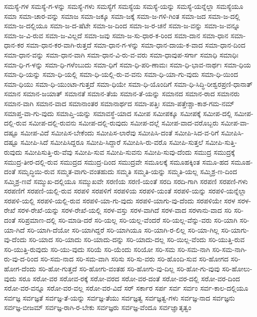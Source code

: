 {ಸಮಸ್ಯೆ-ಗಳ
ಸಮಸ್ಯೆ-ಗ-ಳನ್ನು
ಸಮಸ್ಯೆ-ಗಳು
ಸಮಸ್ಯೆಗೆ
ಸಮಸ್ಯೆಯ
ಸಮಸ್ಯೆ-ಯನ್ನು
ಸಮಸ್ಯೆ-ಯನ್ನೆಲ್ಲಾ
ಸಮಸ್ಯೆಯೂ
ಸಮಾ
ಸಮಾ-ಚಾರ-ವನ್ನು
ಸಮಾಜ
ಸಮಾ-ಜಕ್ಕೂ
ಸಮಾ-ಜಕ್ಕೆ
ಸಮಾ-ಜ-ಗಳಿ-ಗಿಂತ
ಸಮಾ-ಜದ
ಸಮಾ-ಜ-ದಲ್ಲಿ
ಸಮಾ-ಜ-ದಲ್ಲಿಯೂ
ಸಮಾ-ಜ-ದ-ಷೆಟೇ
ಸಮಾ-ಜ-ದಿಂದ
ಸಮಾ-ಜ-ರ-ಚನೆ
ಸಮಾ-ಜ-ವನ್ನು
ಸಮಾ-ಜ-ವನ್ನೂ
ಸಮಾ-ಜ-ವಿ-ರುವ
ಸಮಾ-ಜ-ವಿಲ್ಲದೆ
ಸಮಾ-ಜವು
ಸಮಾ-ಜ-ಸು-ಧಾರ-ಕ-ರಿಂದ
ಸಮಾ-ದಾನ
ಸಮಾ-ಧಾನ
ಸಮಾ-ಧಾನ-ಕರ
ಸಮಾ-ಧಾನ-ಕರ-ವಾಗಿ-ರುತ್ತದೆ
ಸಮಾ-ಧಾನ-ಗ-ಳನ್ನು
ಸಮಾ-ಧಾನ-ದಾಯ-ಕ-ವಾದ
ಸಮಾ-ಧಾನ-ದಿಂದ
ಸಮಾ-ಧಾನ-ವನ್ನು
ಸಮಾ-ಧಾನ-ವಾಗಿ
ಸಮಾ-ಧಾನ-ವಿ-ರು-ವ-ವರು
ಸಮಾ-ಧಾವುಪ-ಸರ್ಗಾ
ಸಮಾಧಿ
ಸಮಾಧಿಃ
ಸಮಾ-ಧಿ-ಗ-ಳನ್ನು
ಸಮಾ-ಧಿ-ಗಳೆಂಬುದು
ಸಮಾ-ಧಿಗೆ
ಸಮಾ-ಧಿ-ಪರಿ-ಣಾಮಃ
ಸಮಾ-ಧಿ-ಭಾವ-ನಾರ್ಥಃ
ಸಮಾ-ಧಿಯ
ಸಮಾ-ಧಿ-ಯನ್ನು
ಸಮಾ-ಧಿ-ಯಲ್ಲಿ
ಸಮಾ-ಧಿ-ಯಲ್ಲಿ-ರು-ವ-ವನು
ಸಮಾ-ಧಿ-ಯಾ-ಗು-ವುದು
ಸಮಾ-ಧಿ-ಯಿಂದ
ಸಮಾ-ಧಿಯು
ಸಮಾ-ಧಿ-ಯುಂಟಾ-ಗುತ್ತದೆ
ಸಮಾ-ಧಿಯೇ
ಸಮಾ-ಧಿ-ಯೊಂದಿಗೆ
ಸಮಾ-ಧಿ-ಸಿದ್ಧಿ-ರೀಶ್ವರಪ್ರಣಿ-ಧಾನಾತ್
ಸಮಾನ
ಸಮಾನ-ಜಯಾತ್
ಸಮಾನತೆ
ಸಮಾನ-ತೆಯ
ಸಮಾನ-ತೆ-ಯನ್ನು
ಸಮಾನದ
ಸಮಾನ-ರಾದ
ಸಮಾನರು
ಸಮಾನ-ವಾಗಿ
ಸಮಾನ-ವಾದ
ಸಮಾನಾಂತರ
ಸಮಾನಾರ್ಥದ
ಸಮಾ-ಪತ್ತಿಃ
ಸಮಾ-ಪತ್ತೇಶ್ಚಾ-ಕಾಶ-ಗಮ-ನಮ್
ಸಮಾಪ್ತ-ವಾ-ಗು-ವುದು
ಸಮಾಪ್ತಿ-ಯನ್ನು
ಸಮಾವಸ್ಥೆ-ಯಾದ
ಸಮೀಪ
ಸಮೀಪಕ್ಕೂ
ಸಮೀಪಕ್ಕೆ
ಸಮೀಪ-ದಲ್ಲಿ
ಸಮೀಪ-ದಲ್ಲಿ-ರುವ
ಸಮೀಪ-ದಲ್ಲಿ-ರುವನು
ಸಮೀಪ-ದಲ್ಲಿ-ರುವುದು
ಸಮೀಪ-ದಲ್ಲೆ
ಸಮೀಪ-ವಾದ-ವರೊಬ್ಬರು
ಸಮೀಪ-ವಾ-ದಷ್ಟೂ
ಸಮೀಪ-ವಿದೆ
ಸಮೀಪಿಸ-ಬೇಕೆಂದು
ಸಮೀಪಿಸ-ಲಾರೆವು
ಸಮೀಪಿಸಿ-ದಂತೆ
ಸಮೀಪಿ-ಸಿದ-ವ-ರಿಗೆ
ಸಮೀಪಿಸಿ-ದಷ್ಟೂ
ಸಮೀಪಿ-ಸಿದೆ
ಸಮೀಪಿಸಿದ್ದರೂ
ಸಮೀಪಿ-ಸಿದ್ದಾರೆ
ಸಮೀಪಿಸಿ-ರು-ವರೊ
ಸಮೀಪಿ-ಸುತ್ತಲೆ
ಸಮೀಪಿ-ಸುತ್ತಿ-ರುವುದು
ಸಮೀಪಿಸುತ್ತಿ-ರು-ವೆವು
ಸಮೀಪಿ-ಸುವ
ಸಮೀಪಿ-ಸುವನು
ಸಮೀಪಿ-ಸುವು-ದೆಂದು
ಸಮುದ್ರ
ಸಮುದ್ರಕ್ಕೆ
ಸಮುದ್ರ-ತೀರ-ದಲ್ಲಿ-ರುವ
ಸಮುದ್ರದ
ಸಮುದ್ರ-ದಿಂದ
ಸಮುದ್ರವೇ
ಸಮೂಲಕ್ಕೆ
ಸಮೂಹಕ್ಕಿಂತ
ಸಮೂ-ಹದ
ಸಮೂಹ-ದಂತೆ
ಸಮೃದ್ಧಿಯಿ-ರುವ
ಸಮ್ಮತ-ವಾಗು-ವಂತಹುದು
ಸಮ್ಮತಿ
ಸಮ್ಮತಿ-ಯನ್ನು
ಸಮ್ಮತಿ-ಯಲ್ಲ
ಸಮ್ಮಿಶ್ರ-ಣ-ದಿಂದ
ಸಮ್ಮಿಶ್ರ-ಣವೆ
ಸಮ್ಮುಖ-ದಲ್ಲಿಯೂ
ಸಮ್ಮುಖವೇ
ಸರಣಿಯ
ಸರಣಿ-ಯಂತೆ
ಸರದಿ
ಸರದಿ-ಗಾಗಿ
ಸರಪಣಿ
ಸರಪಣಿ-ಗಳು
ಸರಪಣಿಗೆ
ಸರಪಣಿ-ಯಲ್ಲಿ-ರುವ
ಸರಪಳಿ
ಸರಪಳಿಗೆ
ಸರಪಳಿಯ
ಸರಪಳಿ-ಯಂತೆ
ಸರಪಳಿ-ಯನ್ನು
ಸರಪಳಿ-ಯನ್ನೆಲ್ಲಾ
ಸರಪಳಿ-ಯಲ್ಲಿ
ಸರಪಳಿ-ಯಲ್ಲಿ-ರುವ
ಸರಪಳಿ-ಯಾ-ಗು-ವುದು
ಸರಪಳಿ-ಯಾಗು-ವು-ದೆಂದು
ಸರಪಳಿಯೇ
ಸರಳ
ಸರಳ-ರೇಖೆ
ಸರಳ-ರೇಖೆ-ಯನ್ನು
ಸರಳ-ರೇಖೆ-ಯಲ್ಲಿ
ಸರಳ-ವಸ್ತು
ಸರಳ-ವಾಗಿದೆ
ಸರಳ-ವಾದ
ಸರಳಾನು-ವಾದ
ಸರಿ
ಸರಿ-ದಂತೆ
ಸರಿಪ್ರಮಾಣ-ದಲ್ಲಿ
ಸರಿ-ಮಾಡಿ-ದರೆ
ಸರಿ-ಯಲ್ಲ
ಸರಿ-ಯಲ್ಲ-ವೆಂದರೆ
ಸರಿ-ಯಲ್ಲ-ವೆನ್ನು-ವರು
ಸರಿ-ಯಾಗಿ
ಸರಿ-ಯಾ-ಗಿದೆ
ಸರಿ-ಯಾಗಿ-ದೆಯೋ
ಸರಿ-ಯಾಗಿದ್ದರೆ
ಸರಿ-ಯಾಗಿಯೂ
ಸರಿ-ಯಾಗಿ-ರ-ಲಿಲ್ಲ
ಸರಿ-ಯಾ-ಗಿಲ್ಲ
ಸರಿ-ಯಾಗು-ವು-ದೆಂದು
ಸರಿ-ಯಾದ
ಸರಿ-ಯಾದು
ಸರಿ-ಯಾದು-ದನ್ನು
ಸರಿ-ಯಾದು-ದಲ್ಲ
ಸರಿ-ಯಿಲ್ಲ-ವೆಂದು
ಸರಿ-ಯುತ್ತಿ-ರುವ
ಸರಿ-ಯುತ್ತಿ-ರುವುದು
ಸರಿ-ಯು-ವುದು
ಸರಿಯೆ
ಸರಿ-ಯೆಂದು
ಸರಿಯೋ
ಸರಿ-ಸಮ
ಸರಿ-ಸಮ-ನಾಗಿ
ಸರಿ-ಸಮ-ನಾಗಿ-ರು-ವು-ದ-ರಿಂದ
ಸರಿ-ಸಮ-ನಾದ
ಸರಿ-ಸಮ-ವಾಗಿ
ಸರಿಸು
ಸರಿ-ಸು-ವರು
ಸರಿ-ಹೊಂದಿ-ಸುವ
ಸರಿ-ಹೋಗದ
ಸರಿ-ಹೋಗ-ದೆಂದು
ಸರಿ-ಹೋ-ಗುತ್ತದೆ
ಸರಿ-ಹೋಗು-ವಂತಹ
ಸರಿ-ಹೋಗು-ವು-ದಿಲ್ಲ
ಸರಿ-ಹೋ-ಗು-ವುವು
ಸರಿ-ಹೋಲು-ವುದು
ಸರೂ
ಸರೋ-ವರ
ಸರೋವ-ರಕ್ಕೆ
ಸರೋ-ವರದ
ಸರೋ-ವರ-ದಂತೆ
ಸರೋ-ವರ-ದಲ್ಲಿ
ಸರೋ-ವರ-ದಿಂದ
ಸರೋ-ವರ-ವನ್ನೂ
ಸರೋ-ವರ-ವಲ್ಲ
ಸರೋ-ವರ-ವಿದೆ
ಸರ್
ಸರ್ಕಾರ
ಸರ್ಪ
ಸರ್ವ
ಸರ್ವಂ
ಸರ್ವ-ಕಾಲ-ದಲ್ಲಿಯೂ
ಸರ್ವಜ್ಞ
ಸರ್ವಜ್ಞತೆ
ಸರ್ವಜ್ಞ-ತೆ-ಯನ್ನು
ಸರ್ವಜ್ಞ-ತೆಯು
ಸರ್ವಜ್ಞತ್ವ
ಸರ್ವಜ್ಞತ್ವ-ಗಳು
ಸರ್ವಜ್ಞ-ನಾದ
ಸರ್ವಜ್ಞನು
ಸರ್ವಜ್ಞ-ಬೀಜಮ್
ಸರ್ವಜ್ಞ-ರಾಗಿ-ರ-ಬೇಕು
ಸರ್ವಜ್ಞರು
ಸರ್ವಜ್ಞ-ವೆಂದೂ
ಸರ್ವಜ್ಞಾತೃತ್ವಂ
}
